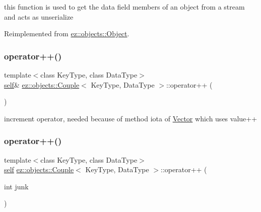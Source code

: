 this function is used to get the data field members of an object from a stream and acts as unserialize 

Reimplemented from \hyperlink{classez_1_1objects_1_1Object_a878bdc53b7f16fda6fa15dab214c4b6a}{ez\+::objects\+::\+Object}.

\mbox{\label{classez_1_1objects_1_1Couple_acd9d9661211e6623461c3c7b2bd37e42}} 
\subsubsection{\texorpdfstring{operator++()}{operator++()}\hspace{0.1cm}{\footnotesize\ttfamily [1/2]}}
{\footnotesize\ttfamily template$<$class Key\+Type, class Data\+Type$>$ \\
\hyperlink{classez_1_1objects_1_1Couple}{self}\& \hyperlink{classez_1_1objects_1_1Couple}{ez\+::objects\+::\+Couple}$<$ Key\+Type, Data\+Type $>$\+::operator++ (\begin{DoxyParamCaption}{ }\end{DoxyParamCaption})\hspace{0.3cm}{\ttfamily [inline]}}

increment operator, needed because of method iota of \hyperlink{classez_1_1objects_1_1Vector}{Vector} which uses value++ \mbox{\label{classez_1_1objects_1_1Couple_aae38d565e36c47a0a7fceaf6abbdf9ec}} 
\subsubsection{\texorpdfstring{operator++()}{operator++()}\hspace{0.1cm}{\footnotesize\ttfamily [2/2]}}
{\footnotesize\ttfamily template$<$class Key\+Type, class Data\+Type$>$ \\
\hyperlink{classez_1_1objects_1_1Couple}{self} \hyperlink{classez_1_1objects_1_1Couple}{ez\+::objects\+::\+Couple}$<$ Key\+Type, Data\+Type $>$\+::operator++ (\begin{DoxyParamCaption}\item[{int}]{junk }\end{DoxyParamCaption})\hspace{0.3cm}{\ttfamily [inline]}}

